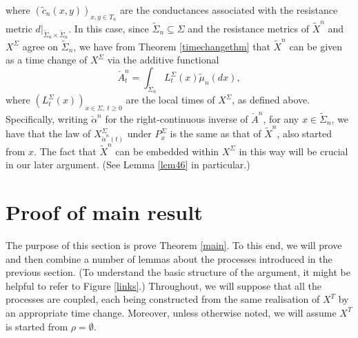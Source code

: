 \documentclass[a4paper, 11pt]{article}
\begin{document}
where $(\tilde{c}_n(x,y))_{x,y\in T_n}$ are the conductances associated with the resistance metric $d|_{\tilde{\Sigma}_n\times \tilde{\Sigma}_n}$. In this case, since $\tilde{\Sigma}_n\subseteq \Sigma$ and the resistance metrics of $\tilde{X}^n$ and $X^\Sigma$ agree on $\tilde{\Sigma}_n$, we have from Theorem \ref{timechangethm} that $\tilde{X}^n$ can be given as a time change of $X^\Sigma$ via the additive functional
\begin{equation}\label{checkan}
\check{A}^n_t=\int_{\tilde{\Sigma}_n}L^\Sigma_t(x)\tilde\mu_n(dx),
\end{equation}
where $(L^\Sigma_t(x))_{x\in \Sigma,\:t\geq 0}$ are the local times of $X^\Sigma$, as defined above. Specifically, writing $\check\alpha^n$ for the right-continuous inverse of $\check{A}^n$, for any $x\in\tilde{\Sigma}_n$, we have that the law of $X^\Sigma_{\check\alpha^n(t)}$ under $P^\Sigma_x$ is the same as that of $\tilde{X}^n$, also started from $x$. The fact that $\tilde{X}^n$ can be embedded within $X^\Sigma$ in this way will be crucial in our later argument. (See Lemma \ref{lem46} in particular.)

\section{Proof of main result}\label{sec4}

The purpose of this section is prove Theorem \ref{main}. To this end, we will prove and then combine a number of lemmas about the processes introduced in the previous section. (To understand the basic structure of the argument, it might be helpful to refer to Figure \ref{links}.) Throughout, we will suppose that all the processes are coupled, each being constructed from the same realisation of $X^T$ by an appropriate time change. Moreover, unless otherwise noted, we will assume $X^T$ is started from $\rho=\emptyset$.
\end{document}
